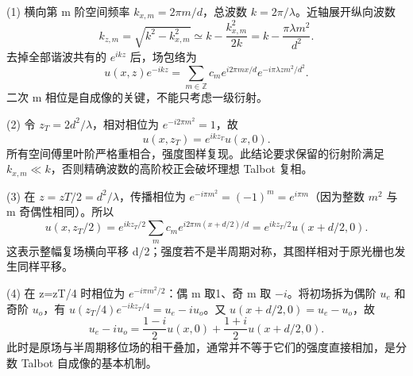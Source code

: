 (1) 横向第 m 阶空间频率 \(k_{x,m}=2\pi m/d\)，总波数 \(k=2\pi/\lambda\)。近轴展开纵向波数
\[
k_{z,m}=\sqrt{k^2-k_{x,m}^2}\simeq k-\frac{k_{x,m}^2}{2k}
=k-\frac{\pi\lambda m^2}{d^2}.
\]
去掉全部谐波共有的 \(e^{ikz}\) 后，场包络为
\[
u(x,z)e^{-ikz}=\sum_{m\in\mathbb Z}c_m e^{i2\pi mx/d}
e^{-i\pi\lambda z m^2/d^2}.
\]
二次 m 相位是自成像的关键，不能只考虑一级衍射。

(2) 令 \(z_T=2d^2/\lambda\)，相对相位为 \(e^{-i2\pi m^2}=1\)，故
\[
u(x,z_T)=e^{ikz_T}u(x,0).
\]
所有空间傅里叶阶严格重相合，强度图样复现。此结论要求保留的衍射阶满足 \(k_{x,m}\ll k\)，否则精确波数的高阶校正会破坏理想 Talbot 复相。

(3) 在 \(z=zT/2=d^{2}/\lambda \)，传播相位为 \(e^{-i\pi m^2}=(-1)^m=e^{i\pi m}\)（因为整数 \(m^2\) 与 m 奇偶性相同）。所以
\[
u(x,z_T/2)=e^{ikz_T/2}\sum_m c_m e^{i2\pi m(x+d/2)/d}
=e^{ikz_T/2}u(x+d/2,0).
\]
这表示整幅复场横向平移 d/2；强度若不是半周期对称，其图样相对于原光栅也发生同样平移。

(4) 在 z=zT/4 时相位为 \(e^{-i\pi m^2/2}\)：偶 m 取1、奇 m 取 \(-i\)。将初场拆为偶阶 \(u_e\) 和奇阶 \(u_o\)，有 \(u(z_T/4)e^{-ikz_T/4}=u_e-i u_o\)。又 \(u(x+d/2,0)=u_e-u_o\)，故
\[
u_e-i u_o=\frac{1-i}{2}u(x,0)+\frac{1+i}{2}u(x+d/2,0).
\]
此时是原场与半周期移位场的相干叠加，通常并不等于它们的强度直接相加，是分数 Talbot 自成像的基本机制。

